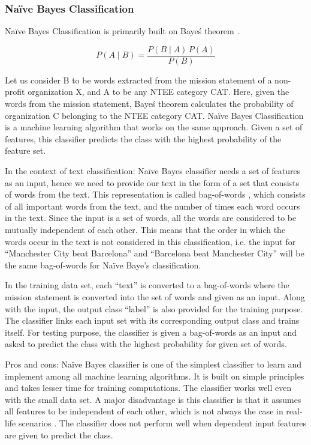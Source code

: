 \documentclass[12pt]{article}
\begin{document}
\subsubsection{Na\"ive Bayes Classification}

Na\"ive Bayes Classification is primarily built on Baye\'s theorem \parencites[34]{upton2014dictionary}.

\begin{equation} \label{Baye\'s Theorem}
 P(A \mid B) = \frac{P(B \mid A) \, P(A)}{P(B)} 
\end{equation}

Let us consider B to be words extracted from the mission statement of a non-profit organization X, and A to be any NTEE category CAT. Here, given the words from the mission statement, Baye\'s theorem calculates the probability of organization C belonging to the NTEE category CAT. Na\"ive Bayes Classification is a machine learning algorithm that works on the same approach. Given a set of features, this classifier predicts the class with the highest probability of the feature set.

In the context of text classification: 
Na\"ive Bayes classifier needs a set of features as an input, hence we need to provide our text in the form of a set that consists of words from the text. This representation is called bag-of-words \parencites{Jurafsky:2009:SLP:1214993}, which consists of all important words from the text, and the number of times each word occurs in the text. Since the input is a set of words, all the words are considered to be mutually independent of each other. This means that the order in which the words occur in the text is not considered in this classification, i.e. the input for ``Manchester City beat Barcelona'' and ``Barcelona beat Manchester City'' will be the same bag-of-words for Na\"ive Baye's classification.

In the training data set, each ``text'' is converted to a bag-of-words where the mission statement is converted into the set of words and given as an input. Along with the input, the output class ``label'' is also provided for the training purpose. The classifier links each input set with its corresponding output class and trains itself. For testing purpose, the classifier is given a bag-of-words as an input and asked to predict the class with the highest probability for given set of words.

Pros and cons:
Na\"ive Bayes classifier is one of the simplest classifier to learn and implement among all machine learning algorithms. It is built on simple principles and takes lesser time for training computations. The classifier works well even with the small data set. A major disadvantage is this classifier is that it assumes all features to be independent of each other, which is not always the case in real-life scenarios \parencites{lewis1998naive}. The classifier does not perform well when dependent input features are given to predict the class.
\end{document}

